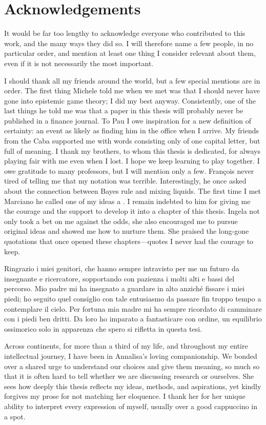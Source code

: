 \chapter*{Acknowledgements}\label{ch:ac} %

It would be far too lengthy to acknowledge everyone who contributed to this work, and the many ways they did so. I will therefore name a few people, in no particular order, and mention at least one thing I consider relevant about them, even if it is not necessarily the most important.

I should thank all my friends around the world, but a few special mentions are in order. The first thing Michele told me when we met was that I should never have gone into epistemic game theory; I did my best anyway. Consistently, one of the last things he told me was that a paper in this thesis will probably never be published in a finance journal. To Pau I owe inspiration for a new definition of certainty: an event as likely as finding him in the office when I arrive. My friends from the Caba supported me with words consisting only of one capital letter, but full of meaning. I thank my brothers, to whom this thesis is dedicated, for always playing fair with me even when I lost. I hope we keep learning to play together. I owe gratitude to many professors, but I will mention only a few. François never tired of telling me that my notation was terrible. Interestingly, he once asked about the connection between Bayes rule and mixing liquids. The first time I met Marciano he called one of my ideas a . I remain indebted to him for giving me the courage and the support to develop it into a chapter of this thesis. Ingela not only took a bet on me against the odds, she also encouraged me to pursue original ideas and showed me how to nurture them. She praised the long-gone quotations that once opened these chapters—quotes I never had the courage to keep.

Ringrazio i miei genitori, che hanno sempre intravisto per me un futuro da insegnante e ricercatore, sopportando con pazienza i molti alti e bassi del percorso. Mio padre mi ha insegnato a guardare in alto anziché fissare i miei piedi; ho seguito quel consiglio con tale entusiasmo da passare fin troppo tempo a contemplare il cielo. Per fortuna mia madre mi ha sempre ricordato di camminare con i piedi ben dritti. Da loro ho imparato a fantasticare con ordine, un equilibrio ossimorico solo in apparenza che spero si rifletta in questa tesi.

Across continents, for more than a third of my life, and throughout my entire intellectual journey, I have been in Annalisa's loving companionship. We bonded over a shared urge to understand our choices and give them meaning, so much so that it is often hard to tell whether we are discussing research or ourselves. She sees how deeply this thesis reflects my ideas, methods, and aspirations, yet kindly forgives my prose for not matching her eloquence. I thank her for her unique ability to interpret every expression of myself, usually over a good cappuccino in a  spot.